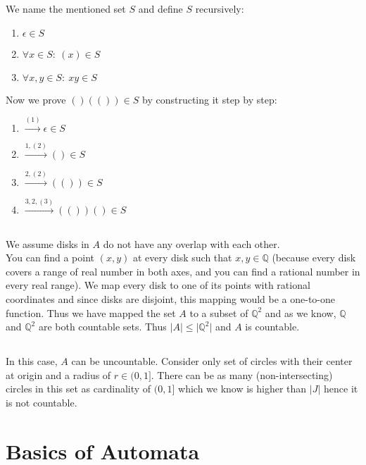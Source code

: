 \documentclass[11pt]{article}
\newcommand{\abs}[1]{\vert #1\vert}
\begin{document}
\subsubsection{}
We name the mentioned set \(S\) and define \(S\) recursively:
\begin{enumerate}[label=\textnormal{(\arabic*)}]
    \item \(\epsilon \in S\)
    \item \(\forall x \in S: \ (x) \in S\)
    \item \(\forall x, y \in S: \ xy \in S\)
\end{enumerate}
Now we prove \(()(()) \in S\) by constructing it step by step:
\begin{enumerate}
    \item \(\xrightarrow{(1)} \epsilon \in S\)
    \item \(\xrightarrow{1, (2)} () \in S\)
    \item \(\xrightarrow{2, (2)} (()) \in S\)
    \item \(\xrightarrow{3, 2, (3)} (())() \in S\)
\end{enumerate}
\subsection{}
We assume disks in \(A\) do not have any overlap with each other. \\
You can find a point \((x, y)\) at every disk such that \(x, y \in \mathbb{Q}\) (because every disk covers a range of real number in both axes, and you can find a rational number in every real range).
We map every disk to one of its points with rational coordinates and
since disks are disjoint, this mapping would be a one-to-one function.
Thus we have mapped the set \(A\) to a subset of \(\mathbb{Q}^2\) and as we know, \(\mathbb{Q}\) and \(\mathbb{Q}^2\) are both countable sets.
Thus \(\abs{A} \leq \abs{\mathbb{Q}^2}\) and \(A\) is countable.

\subsection{}
In this case, \(A\) can be uncountable.
Consider only set of circles with their center at origin and a radius of \(r \in (0, 1]\).
There can be as many (non-intersecting) circles in this set as cardinality of \((0, 1]\) which we know is higher than \(\abs{J}\) hence it is not countable.

\section{Basics of Automata}
\end{document}
